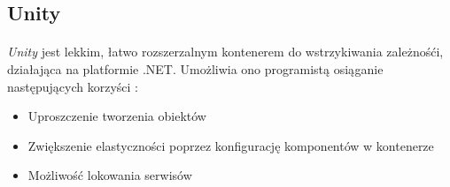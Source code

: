 \subsection{Unity} %
\label{sub:unity}
\paragraph{} %
\label{par:paragraph_name}
\textit{Unity} jest lekkim, łatwo rozszerzalnym kontenerem do wstrzykiwania zależnośći, działająca na platformie .NET. Umożliwia ono programistą osiąganie następujących korzyści :
\begin{itemize}
\item Uproszczenie tworzenia obiektów
\item Zwiększenie elastyczności poprzez konfigurację komponentów w kontenerze
\item Możliwość lokowania serwisów
\end{itemize}
